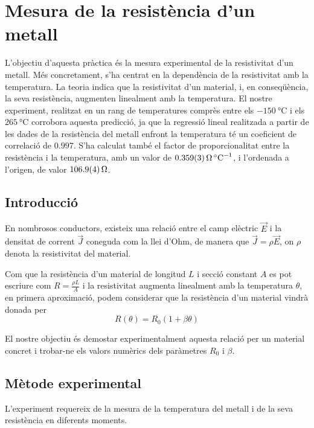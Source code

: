 \chapter{Mesura de la resistència d'un metall} \label{ch:informe 5} 
\begin{resum}
	L'objectiu d'aquesta pràctica és la mesura experimental de la resistivitat d'un metall. Més concretament, s'ha centrat en la dependència de la resistivitat amb la temperatura. La teoria indica que la resistivitat d'un material, i, en conseqüència, la seva resistència, augmenten linealment amb la temperatura. El nostre experiment, realitzat en un rang de temperatures comprès entre els $\SI{-150}{\celsius}$ i els $\SI{265}{\celsius}$ corrobora aquesta predicció, ja que la regressió lineal realitzada a partir de les dades de la resistència del metall enfront la temperatura té un coeficient de correlació de $0.997$. S'ha calculat també el factor de proporcionalitat entre la resistència i la temperatura, amb un valor de $\data{0.359}{0.003}{\ohm.\celsius^{-1}}$, i l'ordenada a l'origen, de valor $\data{106.9}{0.4}{\ohm}$.
\end{resum}

\section{Introducció}
En nombrosos conductors, existeix una relació entre el camp elèctric $\vec{E}$ i la densitat de corrent $\vec{J}$ coneguda com la llei d'Ohm, de manera que $\vec{J}=\rho\vec{E}$, on $\rho$ denota la resistivitat del material.

Com que la resistència d'un material de longitud $L$ i secció constant $A$ es pot escriure com $R=\frac{\rho L}{A}$ i la resistivitat augmenta linealment amb la temperatura \( \theta \), en primera aproximació, podem considerar que la resistència d'un material vindrà donada per 
\begin{equation} \label{eq:regressio}
R(\theta)=R_0(1+\beta\theta)
\end{equation}

El nostre objectiu és demostar experimentalment aquesta relació per un material concret i trobar-ne els valors numèrics dels paràmetres $R_0$ i $\beta$.

\section{Mètode experimental}
L'experiment requereix de la mesura de la temperatura del metall i de la seva resistència en diferents moments.

